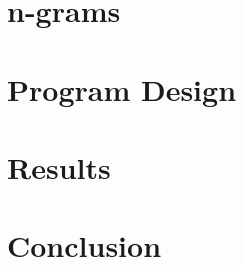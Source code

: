 \documentclass{article}
\begin{document}
\newpage

\section{n-grams}

\newpage

\section{Program Design}

\newpage

\section{Results}

\newpage

\section{Conclusion}
\end{document}
